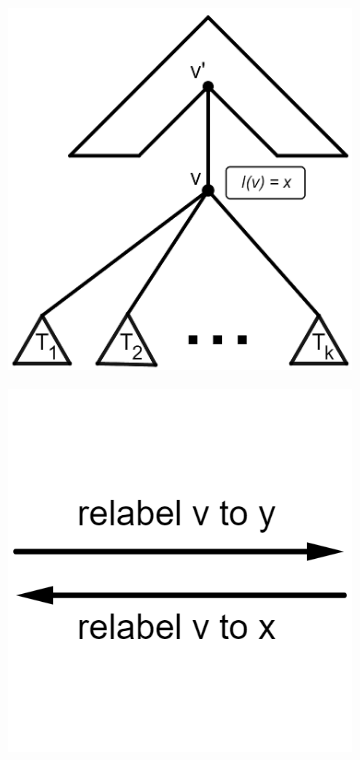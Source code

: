 \begin{figure}[b]
	\captionsetup[subfigure]{labelformat=empty}
	\centering
	\begin{subfigure}[b]{0.18\textwidth}
	\caption{}
	\includegraphics[width=\textwidth]{figures/TreeEditOperation_1.png}
    \end{subfigure}
    \begin{subfigure}[b]{0.18\textwidth}
	\caption{}
	\includegraphics[width=\textwidth]{figures/TreeEditOperation_1,5.png}

\end{subfigure}
\end{figure}
